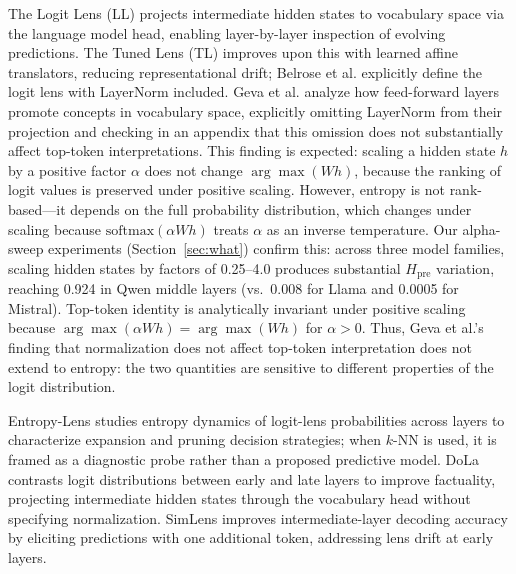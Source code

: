 \documentclass{ieeeaccess}
\newcommand{\Hpre}{H_{\text{pre}}}
\begin{document}
The Logit Lens (LL) \cite{nostalgebraist2020logitlens} projects intermediate hidden states to vocabulary space via the language model head, enabling layer-by-layer inspection of evolving predictions. The Tuned Lens (TL) \cite{belrose2023tuned} improves upon this with learned affine translators, reducing representational drift; Belrose et al. explicitly define the logit lens with LayerNorm included. Geva et al. \cite{geva2022transformer} analyze how feed-forward layers promote concepts in vocabulary space, explicitly omitting LayerNorm from their projection and checking in an appendix that this omission does not substantially affect top-token interpretations. This finding is expected: scaling a hidden state $h$ by a positive factor $\alpha$ does not change $\arg\max(Wh)$, because the ranking of logit values is preserved under positive scaling. However, entropy is not rank-based---it depends on the full probability distribution, which changes under scaling because $\text{softmax}(\alpha Wh)$ treats $\alpha$ as an inverse temperature. Our alpha-sweep experiments (Section~\ref{sec:what}) confirm this: across three model families, scaling hidden states by factors of 0.25--4.0 produces substantial $\Hpre$ variation, reaching 0.924 in Qwen middle layers (vs.\ 0.008 for Llama and 0.0005 for Mistral). Top-token identity is analytically invariant under positive scaling because $\arg\max(\alpha Wh) = \arg\max(Wh)$ for $\alpha > 0$. Thus, Geva et al.'s finding that normalization does not affect top-token interpretation does not extend to entropy: the two quantities are sensitive to different properties of the logit distribution.

Entropy-Lens \cite{ali2025entropylens} studies entropy dynamics of logit-lens probabilities across layers to characterize expansion and pruning decision strategies; when $k$-NN is used, it is framed as a diagnostic probe rather than a proposed predictive model. DoLa \cite{chuang2024dola} contrasts logit distributions between early and late layers to improve factuality, projecting intermediate hidden states through the vocabulary head without specifying normalization. SimLens \cite{ma2025simlens} improves intermediate-layer decoding accuracy by eliciting predictions with one additional token, addressing lens drift at early layers.
\end{document}
